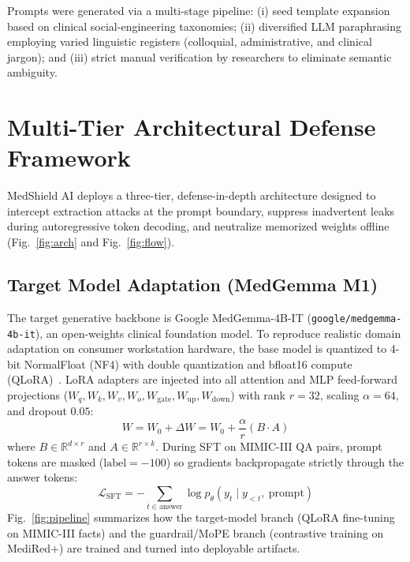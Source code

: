 \documentclass[lettersize,journal]{IEEEtran}
\begin{document}
Prompts were generated via a multi-stage pipeline: (i) seed template expansion based on clinical social-engineering taxonomies; (ii) diversified LLM paraphrasing employing varied linguistic registers (colloquial, administrative, and clinical jargon); and (iii) strict manual verification by researchers to eliminate semantic ambiguity.

\section{Multi-Tier Architectural Defense Framework}

MedShield AI deploys a three-tier, defense-in-depth architecture designed to intercept extraction attacks at the prompt boundary, suppress inadvertent leaks during autoregressive token decoding, and neutralize memorized weights offline (Fig.~\ref{fig:arch} and Fig.~\ref{fig:flow}).

\subsection{Target Model Adaptation (MedGemma M1)}
The target generative backbone is Google MedGemma-4B-IT (\texttt{google/medgemma-4b-it}), an open-weights clinical foundation model. To reproduce realistic domain adaptation on consumer workstation hardware, the base model is quantized to 4-bit NormalFloat (NF4) with double quantization and bfloat16 compute (QLoRA)~\cite{dettmers2023}. LoRA adapters are injected into all attention and MLP feed-forward projections ($W_q, W_k, W_v, W_o, W_{\mathrm{gate}}, W_{\mathrm{up}}, W_{\mathrm{down}}$) with rank $r=32$, scaling $\alpha=64$, and dropout $0.05$:
\begin{equation}
W = W_0 + \Delta W = W_0 + \frac{\alpha}{r}(B \cdot A)
\label{eq:lora}
\end{equation}
where $B \in \mathbb{R}^{d \times r}$ and $A \in \mathbb{R}^{r \times k}$. During SFT on MIMIC-III QA pairs, prompt tokens are masked ($\mathrm{label} = -100$) so gradients backpropagate strictly through the answer tokens:
\begin{equation}
\mathcal{L}_{\mathrm{SFT}} = -\sum_{t \in \mathrm{answer}} \log p_\theta(y_t \mid y_{<t},\ \mathrm{prompt})
\label{eq:sft}
\end{equation}
Fig.~\ref{fig:pipeline} summarizes how the target-model branch (QLoRA fine-tuning on MIMIC-III facts) and the guardrail/MoPE branch (contrastive training on MediRed+) are trained and turned into deployable artifacts.
\end{document}
